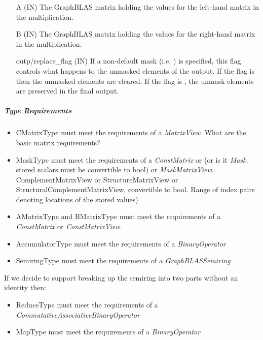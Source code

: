 \begin{itemize}[leftmargin=1.1in]
    \item[{\sf A}]    ({\sf IN}) The GraphBLAS matrix holding the values
    for the left-hand matrix in the multiplication.

    \item[{\sf B}]    ({\sf IN}) The GraphBLAS matrix holding the values for
    the right-hand matrix in the multiplication.

    \item[{\sf outp/replace\_flag}] ({\sf IN}) If a non-default mask (i.e. ) is specified,
    this flag controls what happens to the unmasked elements of the output.  If the flag is 
    then the unmasked elements are cleared.  If the flag is , the unmask elements are preserved in the final output. \\
\end{itemize}

\subparagraph{Type Requirements}

\begin{itemize}[leftmargin=1.1in]
    \item {\sf CMatrixType} must meet the requirements of a \textit{MatrixView}.  What are the basic matrix requirements?
    \item {\sf MaskType} must meet the requirements of a \emph{ConstMatrix} or (or is it \emph{Mask}: stored scalars must be convertible to bool) or \emph{MaskMatrixView}.  ComplementMatrixView or StructureMatrixView or StructuralComplementMatrixView, convertible to bool.  Range of index pairs denoting locations of the stored values)
    \item {\sf AMatrixType} and {\sf BMatrixType} must meet the requirements of a \emph{ConstMatrix} or \emph{ConstMatrixView}.
    \item {\sf AccumulatorType} must meet the requirements of a \emph{BinaryOperator}
    \item {\sf SemiringType} must meet the requirements of a \emph{GraphBLASSemiring}
\end{itemize}

If we decide to support breaking up the semiring into two parts without an identity then:

\begin{itemize}[leftmargin=1.1in]
    \item {\sf ReduceType} must meet the requirements of a \emph{CommutativeAssociativeBinaryOperator}
    \item {\sf MapType} must meet the requirements of a \emph{BinaryOperator}
\end{itemize}

